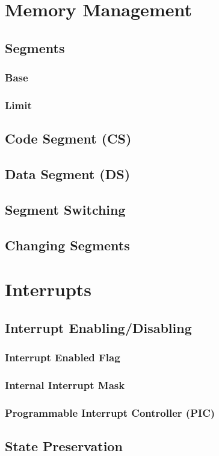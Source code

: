\documentclass[oneside, a4paper]{memoir}
\begin{document}
\chapter{Memory Management}
\section{Segments}
\subsection{Base}
\subsection{Limit}
\section{Code Segment (CS)}
\section{Data Segment (DS)}
\section{Segment Switching}
\section{Changing Segments}

\chapter{Interrupts}
\section{Interrupt Enabling/Disabling}
\subsection{Interrupt Enabled Flag}
\subsection{Internal Interrupt Mask}
\subsection{Programmable Interrupt Controller (PIC)}
\section{State Preservation}
\end{document}
